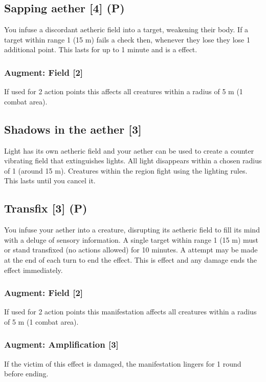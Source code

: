 \subsection{Sapping aether [4] (P)}
You infuse a discordant aetheric field into a target, weakening their body. If a target within range 1 (15 m) fails a  check then, whenever they lose  they lose 1 additional point. This lasts for up to 1 minute and  is a  effect.
\subsubsection{Augment: Field [2]}
If used for 2 action points this affects all creatures within a radius of 5 m (1 combat area).


\subsection{Shadows in the aether [3]}
Light has its own aetheric field and your aether can be used to create a counter vibrating field that extinguishes lights. All light disappears within a chosen radius of 1 (around 15 m). Creatures within the region fight using the  lighting rules. This lasts until you cancel it.


\subsection{Transfix [3] (P)}
You infuse your aether into a creature, disrupting its aetheric field to fill its mind with a deluge of sensory information. A single target within range 1 (15 m) must  or stand transfixed (no actions allowed) for 10 minutes. A  attempt may be made at the end of each turn to end the effect. This is  effect and any damage ends the effect immediately. 
\subsubsection{Augment: Field [2]}
If used for 2 action points this manifestation affects all creatures within a radius of 5 m (1 combat area).
\subsubsection{Augment: Amplification [3]}
If the victim of this effect is damaged, the manifestation lingers for 1 round before ending.


